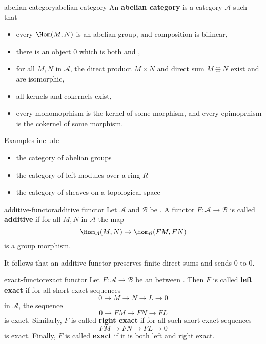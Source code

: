 \begin{topic}{abelian-category}{abelian category}
    An \textbf{abelian category} is a category $\mathcal{A}$ such that
    \begin{itemize}
        \item every $\Hom(M, N)$ is an abelian group, and composition is bilinear,
        \item there is an object $0$ which is both  and ,
        \item for all $M, N$ in $\mathcal{A}$, the direct product $M \times N$ and direct sum $M \oplus N$ exist and are isomorphic,
        \item all kernels and cokernels exist,
        \item every monomoprhism is the kernel of some morphism, and every epimoprhism is the cokernel of some morphism.
    \end{itemize}
    
    Examples include
    \begin{itemize}
        \item the category of abelian groups
        \item the category of left modules over a ring $R$
        \item the category of sheaves on a topological space
    \end{itemize}
\end{topic}

\begin{topic}{additive-functor}{additive functor}
    Let $\mathcal{A}$ and $\mathcal{B}$ be . A functor $F : \mathcal{A} \to \mathcal{B}$ is called \textbf{additive} if for all $M, N$ in $\mathcal{A}$ the map
    \[ \Hom_\mathcal{A}(M, N) \to \Hom_\mathcal{B}(FM, FN) \]
    is a group morphism.
    
    It follows that an additive functor preserves finite direct sums and sends $0$ to $0$.
\end{topic}

\begin{topic}{exact-functor}{exact functor}
    Let $F : \mathcal{A} \to \mathcal{B}$ be an  between . Then $F$ is called \textbf{left exact} if for all short exact sequences
    \[ 0 \to M \to N \to L \to 0 \]
     in $\mathcal{A}$, the sequence
    \[ 0 \to FM \to FN \to FL \]
    is exact. Similarly, $F$ is called \textbf{right exact} if for all such short exact sequences
    \[ FM \to FN \to FL \to 0 \]
    is exact. Finally, $F$ is called \textbf{exact} if it is both left and right exact.
\end{topic}

